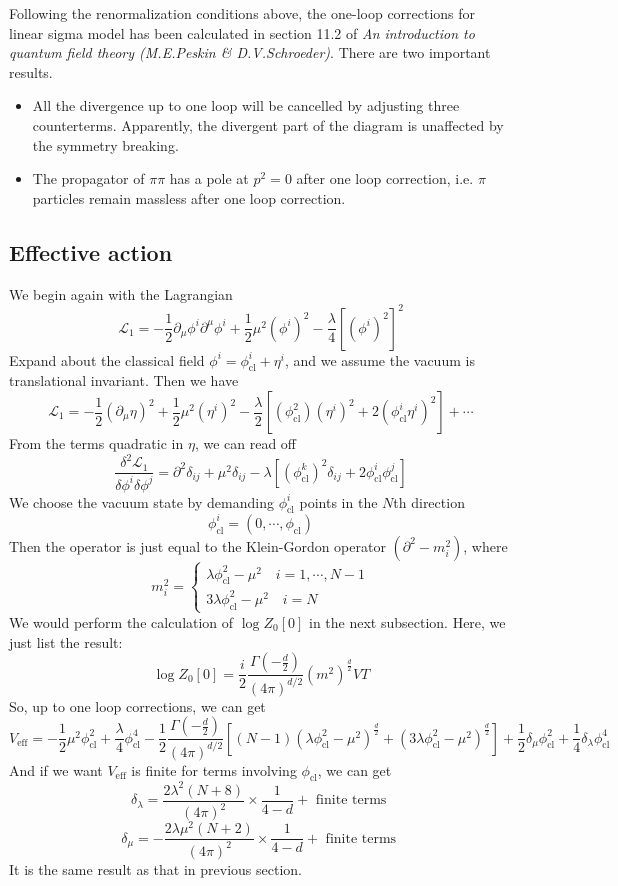 \documentclass[cyan]{elegantnote}
\begin{document}
\noindent
Following the renormalization conditions above, the one-loop corrections for linear sigma model has been calculated in section 11.2 of \emph{An introduction to quantum field theory (M.E.Peskin \& D.V.Schroeder)}. There are two important results.
\begin{itemize}
\item All the divergence up to one loop will be cancelled by adjusting three counterterms. Apparently, the divergent part of the diagram is unaffected by the symmetry breaking.
\item The propagator of $\pi\pi$ has a pole at $p^2 = 0$ after one loop correction, i.e. $\pi$ particles remain massless after one loop correction.
\end{itemize}

\subsection{Effective action}
We begin again with the Lagrangian
\[\mathcal{L}_1 = -\frac{1}{2} \partial_{\mu} \phi^i \partial^{\mu}\phi^i + \frac{1}{2} \mu^2 (\phi^i)^2 - \frac{\lambda}{4} [(\phi^i)^2]^2\]
Expand about the classical field $\phi^i = \phi_{\mathrm{cl}}^i + \eta^i$, and we assume the vacuum is translational invariant. Then we have
\[\mathcal{L}_1 = -\frac{1}{2}(\partial_{\mu}\eta)^2 + \frac{1}{2}\mu^2(\eta^i)^2 - \frac{\lambda}{2}[(\phi_{\mathrm{cl}}^2)(\eta^i)^2+ 2(\phi_{\mathrm{cl}}^i\eta^i)^2] + \cdots\]
From the terms quadratic in $\eta$, we can read off
\[\frac{\delta^2 \mathcal{L}_1}{\delta\phi^i\delta\phi^j} = \partial^2\delta_{ij} + \mu^2\delta_{ij} - \lambda[(\phi_{\mathrm{cl}}^k)^2\delta_{ij} + 2\phi_{\mathrm{cl}}^i \phi_{\mathrm{cl}}^j]\]
We choose the vacuum state by demanding $\phi_{\mathrm{cl}}^i$ points in the $N$th direction
\[\phi_{\mathrm{cl}}^i = (0,\cdots,\phi_{\mathrm{cl}})\]
Then the operator is just equal to the Klein-Gordon operator $(\partial^2-m_i^2)$, where
\[m_i^2 = \begin{cases} \lambda\phi_{\mathrm{cl}}^2-\mu^2 \quad i=1,\cdots,N-1 \\ 3\lambda\phi_{\mathrm{cl}}^2-\mu^2 \quad i=N \end{cases}\]
We would perform the calculation of $\log Z_0[0]$ in the next subsection. Here, we just list the result:
\[\log Z_0[0] = \frac{i}{2}\frac{\Gamma(-\frac{d}{2})}{(4\pi)^{d/2}}(m^2)^{\frac{d}{2}}VT\]
So, up to one loop corrections, we can get
\[V_{\mathrm{eff}} = -\frac{1}{2} \mu^2 \phi_{\mathrm{cl}}^2 + \frac{\lambda}{4} \phi_{\mathrm{cl}}^4 - \frac{1}{2}\frac{\Gamma(-\frac{d}{2})}{(4\pi)^{d/2}}[(N-1)(\lambda\phi_{\mathrm{cl}}^2-\mu^2)^{\frac{d}{2}} + (3\lambda\phi_{\mathrm{cl}}^2-\mu^2)^{\frac{d}{2}}] + \frac{1}{2}\delta_{\mu}\phi_{\mathrm{cl}}^2 + \frac{1}{4}\delta_{\lambda}\phi_{\mathrm{cl}}^4\]
And if we want $V_{\mathrm{eff}}$ is finite for terms involving $\phi_{\mathrm{cl}}$, we can get
\[\delta_{\lambda} = \frac{2\lambda^2(N+8)}{(4\pi)^2} \times \frac{1}{4-d} + \mbox{ finite terms }\]
\[\delta_{\mu} = -\frac{2\lambda\mu^2(N+2)}{(4\pi)^2} \times \frac{1}{4-d} + \mbox{ finite terms }\]
It is the same result as that in previous section.
\end{document}
